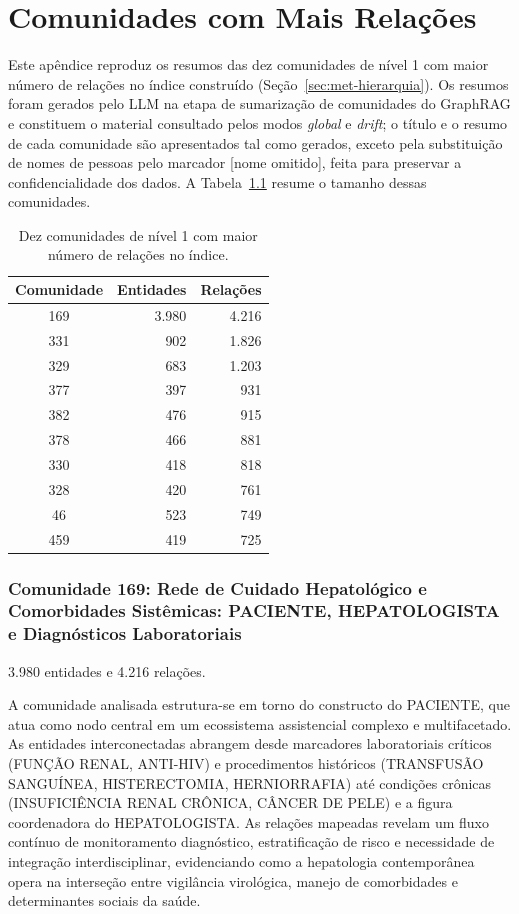 \chapter{Comunidades com Mais Relações}\label{ap:comunidades}

Este apêndice reproduz os resumos das dez comunidades de nível 1 com maior número de relações no índice construído (Seção~\ref{sec:met-hierarquia}). Os resumos foram gerados pelo LLM na etapa de sumarização de comunidades do GraphRAG e constituem o material consultado pelos modos \textit{global} e \textit{drift}; o título e o resumo de cada comunidade são apresentados tal como gerados, exceto pela substituição de nomes de pessoas pelo marcador [nome omitido], feita para preservar a confidencialidade dos dados. A Tabela~\ref{tab:ap-comunidades} resume o tamanho dessas comunidades.

\begin{table}[H]
\centering
\caption[Comunidades de nível 1 com mais relações]{Dez comunidades de nível 1 com maior número de relações no índice.}
\label{tab:ap-comunidades}
\small
\begin{tabular}{crr}
\toprule
Comunidade & Entidades & Relações \\
\midrule
169 & 3.980 & 4.216 \\
331 & 902 & 1.826 \\
329 & 683 & 1.203 \\
377 & 397 & 931 \\
382 & 476 & 915 \\
378 & 466 & 881 \\
330 & 418 & 818 \\
328 & 420 & 761 \\
46 & 523 & 749 \\
459 & 419 & 725 \\
\bottomrule
\end{tabular}
\par{}
\end{table}

\subsection*{Comunidade 169: Rede de Cuidado Hepatológico e Comorbidades Sistêmicas: PACIENTE, HEPATOLOGISTA e Diagnósticos Laboratoriais}

{\small 3.980 entidades e 4.216 relações.}

A comunidade analisada estrutura-se em torno do constructo do PACIENTE, que atua como nodo central em um ecossistema assistencial complexo e multifacetado. As entidades interconectadas abrangem desde marcadores laboratoriais críticos (FUNÇÃO RENAL, ANTI-HIV) e procedimentos históricos (TRANSFUSÃO SANGUÍNEA, HISTERECTOMIA, HERNIORRAFIA) até condições crônicas (INSUFICIÊNCIA RENAL CRÔNICA, CÂNCER DE PELE) e a figura coordenadora do HEPATOLOGISTA. As relações mapeadas revelam um fluxo contínuo de monitoramento diagnóstico, estratificação de risco e necessidade de integração interdisciplinar, evidenciando como a hepatologia contemporânea opera na interseção entre vigilância virológica, manejo de comorbidades e determinantes sociais da saúde.

